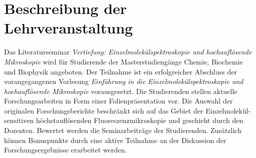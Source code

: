 \section{Beschreibung der Lehrveranstaltung}
Das Literaturseminar {\it Vertiefung: Einzelmolekülspektroskopie und hochauflösende Mikroskopie} wird für Studierende der Masterstudiengänge Chemie, Biochemie und Biophysik angeboten. Der Teilnahme ist ein erfolgreicher Abschluss der vorangegangenen Vorlesung {\it Einführung in die Einzelmolekülspektroskopie und hochauflösende Mikroskopie} vorausgesetzt. Die Studierenden stellen aktuelle Forschungsarbeiten in Form einer Folienpräsentation vor. Die Auswahl der originalen Forschungsberichte beschränkt sich auf das Gebiet der Einzelmolekül-sensitiven höchstauflösenden Fluoreszenzmikroskopie und geschieht durch den Dozenten. Bewertet werden die Seminarbeiträge der Studierenden. Zusätzlich können Bonuspunkte durch eine aktive Teilnahme an der Diskussion der Forschungsergebnisse erarbeitet werden.